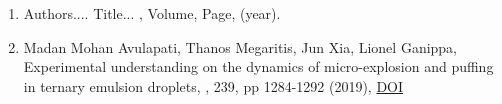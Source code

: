 \listofpapers

\begin{enumerate}  
\item Authors....  \newblock
 Title...
  , Volume,
  Page, (year).
  \item Madan Mohan Avulapati, Thanos Megaritis, Jun Xia, Lionel Ganippa, \newblock Experimental understanding on the dynamics of micro-explosion and puffing in ternary emulsion droplets, , 239, pp 1284-1292 (2019), \href{https://doi.org/10.1016/j.fuel.2018.11.112}{DOI}
\end{enumerate}  